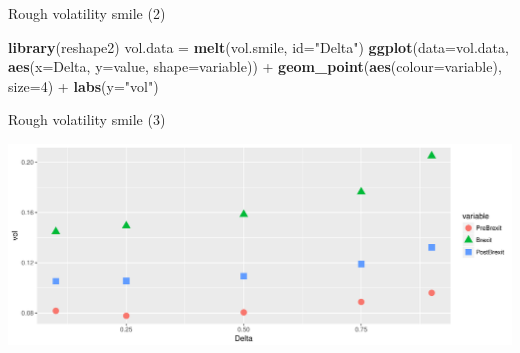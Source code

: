 \documentclass[ignorenonframetext,aspectratio=169]{beamer}
\newenvironment{Shaded}{}{}
\newcommand{\KeywordTok}[1]{\textcolor[rgb]{0.00,0.44,0.13}{\textbf{#1}}}
\newcommand{\DataTypeTok}[1]{\textcolor[rgb]{0.56,0.13,0.00}{#1}}
\newcommand{\DecValTok}[1]{\textcolor[rgb]{0.25,0.63,0.44}{#1}}
\newcommand{\StringTok}[1]{\textcolor[rgb]{0.25,0.44,0.63}{#1}}
\newcommand{\OperatorTok}[1]{\textcolor[rgb]{0.40,0.40,0.40}{#1}}
\newcommand{\NormalTok}[1]{#1}
\begin{document}
\begin{frame}[fragile]{Rough volatility smile (2)}

\begin{Shaded}
\begin{Highlighting}[]
\KeywordTok{library}\NormalTok{(reshape2)}
\NormalTok{vol.data =}\StringTok{ }\KeywordTok{melt}\NormalTok{(vol.smile, }\DataTypeTok{id=}\StringTok{"Delta"}\NormalTok{)}
\KeywordTok{ggplot}\NormalTok{(}\DataTypeTok{data=}\NormalTok{vol.data, }\KeywordTok{aes}\NormalTok{(}\DataTypeTok{x=}\NormalTok{Delta, }\DataTypeTok{y=}\NormalTok{value, }\DataTypeTok{shape=}\NormalTok{variable)) }\OperatorTok{+}
\StringTok{   }\KeywordTok{geom_point}\NormalTok{(}\KeywordTok{aes}\NormalTok{(}\DataTypeTok{colour=}\NormalTok{variable), }\DataTypeTok{size=}\DecValTok{4}\NormalTok{) }\OperatorTok{+}
\StringTok{   }\KeywordTok{labs}\NormalTok{(}\DataTypeTok{y=}\StringTok{"vol"}\NormalTok{)}
\end{Highlighting}
\end{Shaded}

\end{frame}

\begin{frame}{Rough volatility smile (3)}

\includegraphics[width=1\linewidth]{2018_02_07_IMF_FXCourse_files/figure-beamer/unnamed-chunk-33-1}

\end{frame}
\end{document}
